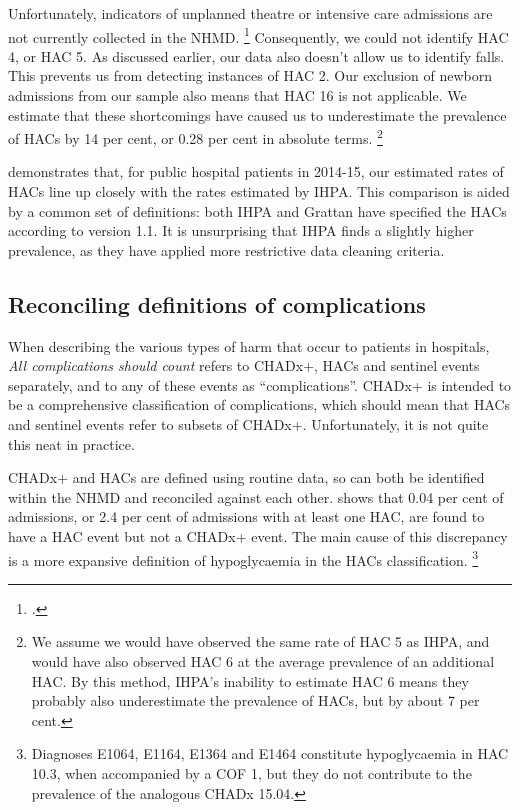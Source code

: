 \documentclass[submission]{grattan}
\newcommand*{\myTitle}{All complications should count}
\begin{document}
Unfortunately, indicators of unplanned theatre or intensive care admissions are not currently collected in the NHMD.%
	\footcite{ACSQHC-2016-Hospital-acquired-complications-v1.1}
Consequently, we could not identify HAC 4, or HAC 5.
As discussed earlier, our data also doesn't allow us to identify falls.
This prevents us from detecting instances of HAC 2.
Our exclusion of newborn admissions from our sample also means that HAC 16 is not applicable.
We estimate that these shortcomings have caused us to underestimate the prevalence of HACs by 14 per cent, or 0.28 per cent in absolute terms.%
	\footnote{We assume we would have observed the same rate of HAC 5 as IHPA, and would have also observed HAC 6 at the average prevalence of an additional HAC\@.
	By this method, IHPA's inability to estimate HAC 6 means they probably also underestimate the prevalence of HACs, but by about 7 per cent.}

 demonstrates that, for public hospital patients in 2014-15, our estimated rates of HACs line up closely with the rates estimated by IHPA\@.
This comparison is aided by a common set of definitions: both IHPA and Grattan have specified the HACs according to version 1.1.
It is unsurprising that IHPA finds a slightly higher prevalence, as they have applied more restrictive data cleaning criteria.

\subsection{Reconciling definitions of complications}\label{subsec:reconciling-definitions-of-complications}

When describing the various types of harm that occur to patients in hospitals, \textit{\myTitle} refers to CHADx+, HACs and sentinel events separately, and to any of these events as ``complications''.
CHADx+ is intended to be a comprehensive classification of complications, which should mean that HACs and sentinel events refer to subsets of CHADx+.
Unfortunately, it is not quite this neat in practice.

CHADx+ and HACs are defined using routine data, so can both be identified within the NHMD and reconciled against each other.  shows that 0.04 per cent of admissions, or 2.4 per cent of admissions with at least one HAC, are found to have a HAC event but not a CHADx+ event.
The main cause of this discrepancy is a more expansive definition of hypoglycaemia in the HACs classification.%
	\footnote{Diagnoses E1064, E1164, E1364 and E1464 constitute hypoglycaemia in HAC 10.3, when accompanied by a COF 1, but they do not contribute to the prevalence of the analogous CHADx 15.04.}
\end{document}
